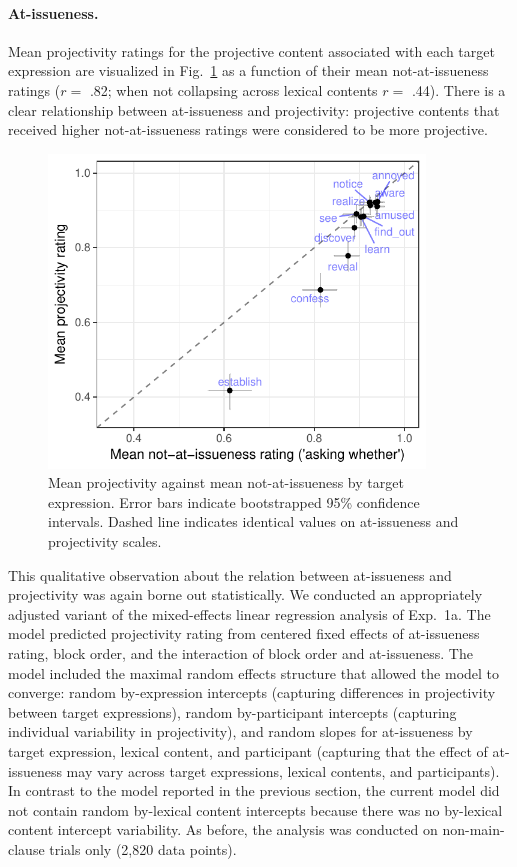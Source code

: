 \documentclass[11pt,fleqn]{article}
\newcommand{\6}{\mbox{$[\hspace*{-.6mm}[$}}
\newcommand{\9}{\mbox{$]\hspace*{-.6mm}]$}}
\newcommand{\figref}[1]{Fig.~\ref{#1}}
\begin{document}
\paragraph{At-issueness.} Mean projectivity ratings for the projective content associated with each target expression are visualized in \figref{fig:f-proj-ai-1b} as a function of their mean not-at-issueness ratings ($r =$ .82; when not collapsing across lexical contents $r =$ .44). There is a clear relationship between at-issueness and projectivity: projective contents that received higher not-at-issueness ratings were considered to be more projective.

\begin{figure}[!h]

\begin{center}
\includegraphics[width=10cm]{../results/exp1b/graphs/ai-proj-bytrigger-labels}
\end{center}

\caption{Mean projectivity against mean not-at-issueness by target expression. Error bars indicate bootstrapped 95\% confidence intervals. Dashed line indicates identical values on at-issueness and projectivity scales.}
\label{fig:f-proj-ai-1b}
\end{figure}

This qualitative observation about the relation between at-issueness and projectivity was again borne out statistically. We conducted an appropriately adjusted variant of the mixed-effects linear regression analysis of Exp.~1a. The model predicted projectivity rating from centered fixed effects of at-issueness rating, block order, and the interaction of block order and at-issueness. The model included the maximal random effects structure that allowed the model to converge: random by-expression intercepts (capturing differences in projectivity between target expressions),  random by-participant intercepts (capturing individual variability in projectivity), and random slopes for at-issueness by target expression, lexical content, and participant (capturing that the effect of at-issueness may vary across target expressions, lexical contents, and participants). In contrast to the model reported in the previous section, the current model did not contain random by-lexical content intercepts because there was no by-lexical content intercept variability. As before, the analysis was conducted on non-main-clause trials only (2,820 data points).
\end{document}
